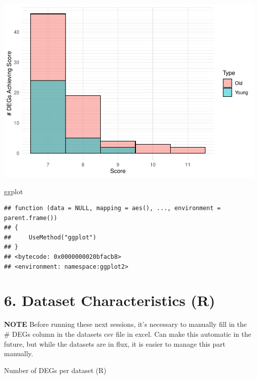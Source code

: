 \documentclass[
]{article}
\newenvironment{Shaded}{\begin{snugshade}}{\end{snugshade}}
\newcommand{\DataTypeTok}[1]{\textcolor[rgb]{0.13,0.29,0.53}{#1}}
\newcommand{\FloatTok}[1]{\textcolor[rgb]{0.00,0.00,0.81}{#1}}
\newcommand{\KeywordTok}[1]{\textcolor[rgb]{0.13,0.29,0.53}{\textbf{#1}}}
\newcommand{\NormalTok}[1]{#1}
\newcommand{\OperatorTok}[1]{\textcolor[rgb]{0.81,0.36,0.00}{\textbf{#1}}}
\newcommand{\OtherTok}[1]{\textcolor[rgb]{0.56,0.35,0.01}{#1}}
\newcommand{\StringTok}[1]{\textcolor[rgb]{0.31,0.60,0.02}{#1}}
\begin{document}
\includegraphics{Thesis_DualCodeTest_files/figure-latex/unnamed-chunk-36-1.pdf}

\begin{Shaded}
\begin{Highlighting}[]
\NormalTok{ggplot}
\end{Highlighting}
\end{Shaded}

\begin{verbatim}
## function (data = NULL, mapping = aes(), ..., environment = parent.frame()) 
## {
##     UseMethod("ggplot")
## }
## <bytecode: 0x0000000020bfacb8>
## <environment: namespace:ggplot2>
\end{verbatim}

\hypertarget{dataset-characteristics-r}{%
\section{6. Dataset Characteristics
(R)}\label{dataset-characteristics-r}}

\textbf{NOTE} Before running these next sessions, it's necessary to
manually fill in the \# DEGs column in the datasets csv file in excel.
Can make this automatic in the future, but while the datasets are in
flux, it is easier to manage this part manually.

Number of DEGs per dataset (R)

\begin{Shaded}
\end{Shaded}
\end{document}
